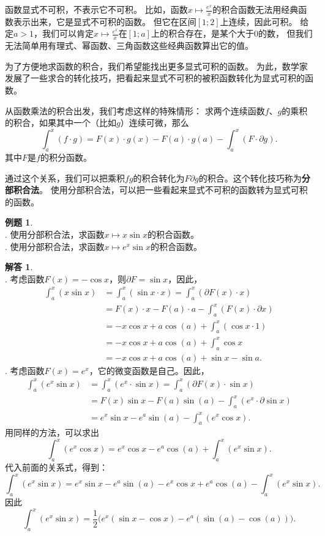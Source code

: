 \documentclass[12pt,UTF8]{ctexbook}
\theoremstyle{definition}
\newtheorem{et}{例题}[section]
\newtheorem*{so}{解答}
\theoremstyle{plain}
\begin{document}
函数显式不可积，不表示它不可积。
比如，函数$x\mapsto \frac{e^x}{x}$的积合函数无法用经典函数表示出来，它是显式不可积的函数。
但它在区间$[1;2]$上连续，因此可积。
给定$a>1$，我们可以肯定$x\mapsto \frac{e^x}{x}$在$[1; a]$上的积合存在，是某个大于$0$的数，
但我们无法简单用有理式、幂函数、三角函数这些经典函数算出它的值。

为了方便地求函数的积合，我们希望能找出更多显式可积的函数。
为此，数学家发展了一些求合的转化技巧，把看起来显式不可积的被积函数转化为显式可积的函数。

从函数乘法的积合出发，我们考虑这样的特殊情形：
求两个连续函数$f$、$g$的乘积的积合，如果其中一个（比如$g$）连续可微，那么
$$ \int_a^x (f \cdot g) = F(x)\cdot g(x) - F(a)\cdot g(a) - \int_a^x (F \cdot \partial g). $$
其中$F$是$f$的积分函数。

通过这个关系，我们可以把乘积$fg$的积合转化为$F\partial g$的积合。这个转化技巧称为\textbf{分部积合法}。
使用分部积合法，可以把一些看起来显式不可积的函数转为显式可积的函数。

\begin{et}
    \mbox{} \\
    . 使用分部积合法，求函数$x\mapsto x \sin{x}$的积合函数。\\
    . 使用分部积合法，求函数$x\mapsto e^x \sin{x}$的积合函数。\\
\end{et}

\begin{so}    
    \mbox{} \\
    . 考虑函数$F(x) = -\cos{x}$，则$\partial F = \sin{x}$，因此，
    \begin{align*}
        \int_a^x (x\sin{x}) &= \int_a^x (\sin{x}\cdot x) = \int_a^x (\partial F(x) \cdot x) \\
        &= F(x)\cdot x - F(a)\cdot a - \int_a^x (F(x) \cdot \partial x) \\
        &= -x\cos{x} + a\cos(a) + \int_a^x (\cos{x} \cdot 1) \\
        &= -x\cos{x} + a\cos(a) + \int_a^x \cos{x} \\
        &= -x\cos{x} + a\cos(a) + \sin{x} - \sin{a}.
    \end{align*}
    . 考虑函数$F(x) = e^x$，它的微变函数是自己。因此，
    \begin{align*}
        \int_a^x \left(e^{x} \sin{x}\right) &= \int_a^x \left(e^x\cdot \sin{x}\right) = \int_a^x \left(\partial F(x) \cdot \sin{x}\right) \\
        &= F(x)\sin{x} - F(a)\sin(a) - \int_a^x \left(e^{x} \cdot \partial \sin{x}\right) \\
        &= e^x\sin{x} - e^a\sin(a) - \int_a^x \left(e^x \cos{x}\right) .
    \end{align*}
    用同样的方法，可以求出
    $$  \int_a^x \left(e^x \cos{x}\right) = e^x\cos{x} - e^a\cos(a) + \int_a^x \left(e^{x} \sin{x}\right). $$
    代入前面的关系式，得到：
    $$ \int_a^x \left(e^{x} \sin{x}\right) = e^x\sin{x} - e^a\sin(a) - e^x\cos{x} + e^a\cos(a) - \int_a^x \left(e^{x} \sin{x}\right). $$
    因此
    $$ \int_a^x \left(e^{x} \sin{x}\right) = \frac{1}{2}\big(e^x(\sin{x} - \cos{x}) - e^a(\sin(a) - \cos(a))\big).$$
\end{so}
\end{document}
